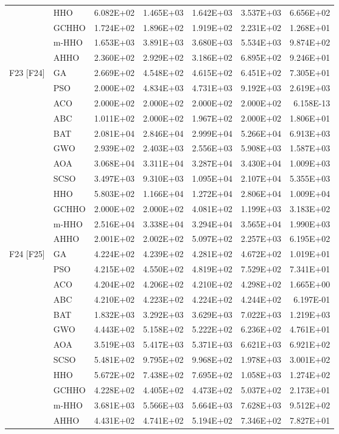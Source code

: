 \begin{longtable}{llrrrrr}
 & HHO & 6.082E+02 & 1.465E+03 & 1.642E+03 & 3.537E+03 & 6.656E+02 \\
 & GCHHO & 1.724E+02 & 1.896E+02 & 1.919E+02 & 2.231E+02 & 1.268E+01 \\
 & m-HHO & 1.653E+03 & 3.891E+03 & 3.680E+03 & 5.534E+03 & 9.874E+02 \\
 & AHHO & 2.360E+02 & 2.929E+02 & 3.186E+02 & 6.895E+02 & 9.246E+01 \\
\addlinespace
F23 [F24] & GA & 2.669E+02 & 4.548E+02 & 4.615E+02 & 6.451E+02 & 7.305E+01 \\
 & PSO & 2.000E+02 & 4.834E+03 & 4.731E+03 & 9.192E+03 & 2.619E+03 \\
 & ACO & 2.000E+02 & 2.000E+02 & 2.000E+02 & 2.000E+02 & 6.158E-13 \\
 & ABC & 1.011E+02 & 2.000E+02 & 1.967E+02 & 2.000E+02 & 1.806E+01 \\
 & BAT & 2.081E+04 & 2.846E+04 & 2.999E+04 & 5.266E+04 & 6.913E+03 \\
 & GWO & 2.939E+02 & 2.403E+03 & 2.556E+03 & 5.908E+03 & 1.587E+03 \\
 & AOA & 3.068E+04 & 3.311E+04 & 3.287E+04 & 3.430E+04 & 1.009E+03 \\
 & SCSO & 3.497E+03 & 9.310E+03 & 1.095E+04 & 2.107E+04 & 5.355E+03 \\
 & HHO & 5.803E+02 & 1.166E+04 & 1.272E+04 & 2.806E+04 & 1.009E+04 \\
 & GCHHO & 2.000E+02 & 2.000E+02 & 4.081E+02 & 1.199E+03 & 3.183E+02 \\
 & m-HHO & 2.516E+04 & 3.338E+04 & 3.294E+04 & 3.565E+04 & 1.990E+03 \\
 & AHHO & 2.001E+02 & 2.002E+02 & 5.097E+02 & 2.257E+03 & 6.195E+02 \\
\addlinespace
F24 [F25] & GA & 4.224E+02 & 4.239E+02 & 4.281E+02 & 4.672E+02 & 1.019E+01 \\
 & PSO & 4.215E+02 & 4.550E+02 & 4.819E+02 & 7.529E+02 & 7.341E+01 \\
 & ACO & 4.204E+02 & 4.206E+02 & 4.210E+02 & 4.298E+02 & 1.665E+00 \\
 & ABC & 4.210E+02 & 4.223E+02 & 4.224E+02 & 4.244E+02 & 6.197E-01 \\
 & BAT & 1.832E+03 & 3.292E+03 & 3.629E+03 & 7.022E+03 & 1.219E+03 \\
 & GWO & 4.443E+02 & 5.158E+02 & 5.222E+02 & 6.236E+02 & 4.761E+01 \\
 & AOA & 3.519E+03 & 5.417E+03 & 5.371E+03 & 6.621E+03 & 6.921E+02 \\
 & SCSO & 5.481E+02 & 9.795E+02 & 9.968E+02 & 1.978E+03 & 3.001E+02 \\
 & HHO & 5.672E+02 & 7.438E+02 & 7.695E+02 & 1.058E+03 & 1.274E+02 \\
 & GCHHO & 4.228E+02 & 4.405E+02 & 4.473E+02 & 5.037E+02 & 2.173E+01 \\
 & m-HHO & 3.681E+03 & 5.566E+03 & 5.664E+03 & 7.628E+03 & 9.512E+02 \\
 & AHHO & 4.431E+02 & 4.741E+02 & 5.194E+02 & 7.346E+02 & 7.827E+01 \\
\end{longtable}

